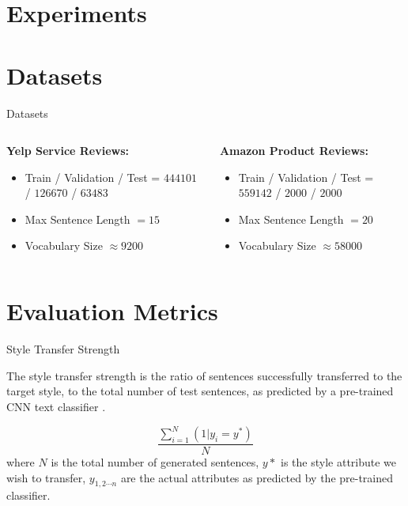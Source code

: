 \documentclass[aspectratio=169]{beamer}
\begin{document}
% 

\section{Experiments}

\section{Datasets}

\begin{frame}{Datasets}
	\begin{columns}[T] %
		\begin{column}{.48\textwidth}
			\Large
			\textbf{Yelp Service Reviews:}

			\citep{shen2017style}
			\begin{itemize}
				\item Train / Validation / Test = $444101$ / $126670$ / $63483$
				\item Max Sentence Length $= 15$
				\item Vocabulary Size $\approx 9200$
			\end{itemize}
		\end{column}
		\hfill
		\begin{column}{.48\textwidth}
			\Large
			\textbf{Amazon Product Reviews:}

			\citep{fu2017style}
			\begin{itemize}
				\item Train / Validation / Test = $559142$ / $2000$ / $2000$
				\item Max Sentence Length $= 20$
				\item Vocabulary Size $\approx 58000$
			\end{itemize}
		\end{column}
	\end{columns}

\end{frame}

\section{Evaluation Metrics}

\begin{frame}{Style Transfer Strength}

	The style transfer strength is the ratio of sentences successfully transferred to the target style, to the total number of test sentences, as predicted by a pre-trained CNN text classifier \citep{kim2014convolutional}.

	\begin{equation*}
		\frac{\sum_{i=1}^{N}{(1 | y_i = y^*)}}{N}
	\end{equation*}
	where
	$N$ is the total number of generated sentences,
	$y*$ is the style attribute we wish to transfer,
	$y_{1, 2 \cdots n}$ are the actual attributes as predicted by the pre-trained classifier.
\end{frame}
\end{document}
